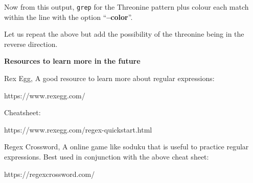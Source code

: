 \documentclass[
  letterpaper,
  DIV=11,
  numbers=noendperiod]{scrreprt}
\newenvironment{Shaded}{\begin{snugshade}}{\end{snugshade}}
\newcommand{\AttributeTok}[1]{\textcolor[rgb]{0.40,0.45,0.13}{#1}}
\newcommand{\DataTypeTok}[1]{\textcolor[rgb]{0.68,0.00,0.00}{#1}}
\newcommand{\FunctionTok}[1]{\textcolor[rgb]{0.28,0.35,0.67}{#1}}
\newcommand{\KeywordTok}[1]{\textcolor[rgb]{0.00,0.23,0.31}{#1}}
\newcommand{\NormalTok}[1]{\textcolor[rgb]{0.00,0.23,0.31}{#1}}
\newcommand{\StringTok}[1]{\textcolor[rgb]{0.13,0.47,0.30}{#1}}
\begin{document}
\begin{Shaded}
\end{Shaded}

Now from this output, \texttt{grep} for the Threonine pattern plus
colour each match within the line with the option ``\textbf{--color}''.

\begin{Shaded}
\end{Shaded}

Let us repeat the above but add the possibility of the threonine being
in the reverse direction.

\begin{Shaded}
\end{Shaded}

\textbf{Resources to learn more in the future}

Rex Egg, A good resource to learn more about regular expressions:

https://www.rexegg.com/

Cheatsheet:

https://www.rexegg.com/regex-quickstart.html

Regex Crossword, A online game like soduku that is useful to practice
regular expressions. Best used in conjunction with the above cheat
sheet:

https://regexcrossword.com/
\end{document}
